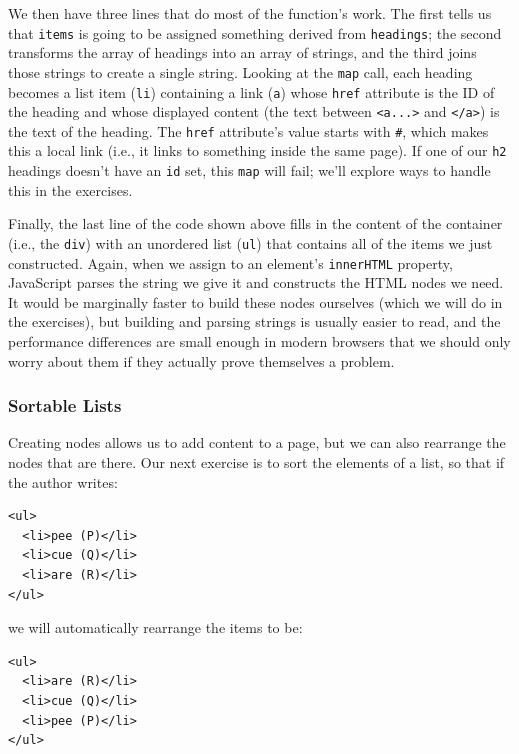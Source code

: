 We then have three lines that do most of the function's work. The first
tells us that \texttt{items} is going to be assigned something derived
from \texttt{headings}; the second transforms the array of headings into
an array of strings, and the third joins those strings to create a
single string. Looking at the \texttt{map} call, each heading becomes a
list item (\texttt{li}) containing a link (\texttt{a}) whose
\texttt{href} attribute is the ID of the heading and whose displayed
content (the text between \texttt{\textless{}a...\textgreater{}} and
\texttt{\textless{}/a\textgreater{}}) is the text of the heading. The
\texttt{href} attribute's value starts with \texttt{\#}, which makes
this a local link (i.e., it links to something inside the same page). If
one of our \texttt{h2} headings doesn't have an \texttt{id} set, this
\texttt{map} will fail; we'll explore ways to handle this in the
exercises.

Finally, the last line of the code shown above fills in the content of
the container (i.e., the \texttt{div}) with an unordered list
(\texttt{ul}) that contains all of the items we just constructed. Again,
when we assign to an element's \texttt{innerHTML} property, JavaScript
parses the string we give it and constructs the HTML nodes we need. It
would be marginally faster to build these nodes ourselves (which we will
do in the exercises), but building and parsing strings is usually easier
to read, and the performance differences are small enough in modern
browsers that we should only worry about them if they actually prove
themselves a problem.

\subsubsection{Sortable Lists}\label{s:pages-sort-list}

Creating nodes allows us to add content to a page, but we can also
rearrange the nodes that are there. Our next exercise is to sort the
elements of a list, so that if the author writes:

\begin{verbatim}
<ul>
  <li>pee (P)</li>
  <li>cue (Q)</li>
  <li>are (R)</li>
</ul>
\end{verbatim}

we will automatically rearrange the items to be:

\begin{verbatim}
<ul>
  <li>are (R)</li>
  <li>cue (Q)</li>
  <li>pee (P)</li>
</ul>
\end{verbatim}


